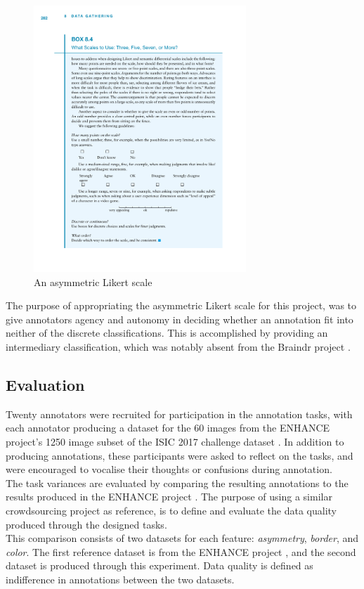 \documentclass[../report.tex]{subfiles}
\begin{document}
\begin{figure}[h!]
\centering
\includegraphics[width=8cm]{figures/likert.pdf}
\caption{An asymmetric Likert scale \cite{joshi2015likert}}
\label{fig:likert}
\end{figure}

The purpose of appropriating the asymmetric Likert scale for this project, was to give annotators agency and autonomy in deciding whether an annotation fit into neither of the discrete classifications. This is accomplished by providing an intermediary classification, which was notably absent from the Braindr project \cite{Braindr}.

\subsection{Evaluation}

Twenty annotators were recruited for participation in the annotation tasks, with each annotator producing a dataset for the 60 images from the ENHANCE project's \cite{Ralf2021ENHANCE} 1250 image subset of the ISIC 2017 challenge dataset \cite{ISIC2017Challenge}. In addition to producing annotations, these participants were asked to reflect on the tasks, and were encouraged to vocalise their thoughts or confusions during annotation. \\

The task variances are evaluated by comparing the resulting annotations to the results produced in the ENHANCE project \cite{Ralf2021ENHANCE}. The purpose of using a similar crowdsourcing project as reference, is to define and evaluate the data quality produced through the designed tasks. \\

This comparison consists of two datasets for each feature: \textit{asymmetry}, \textit{border}, and \textit{color}. The first reference dataset is from the ENHANCE project \cite{Ralf2021ENHANCE}, and the second dataset is produced through this experiment. Data quality is defined as indifference in annotations between the two datasets.
\end{document}
